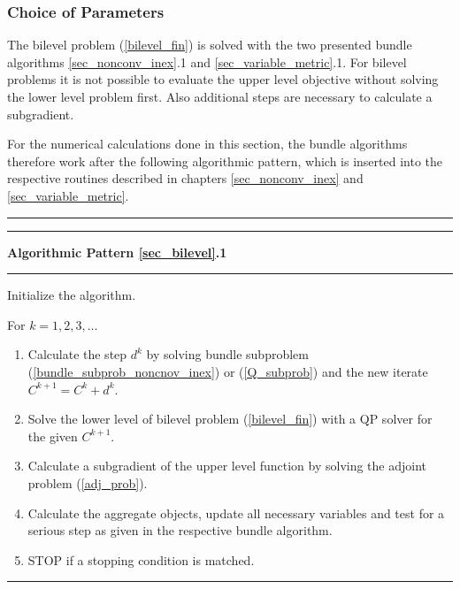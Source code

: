 \subsubsection{Choice of Parameters}

The bilevel problem (\ref{bilevel_fin}) is solved with the two presented bundle algorithms \ref{sec_nonconv_inex}.1 and \ref{sec_variable_metric}.1.
For bilevel problems it is not possible to evaluate the upper level objective without solving the lower level problem first. Also additional steps are necessary to calculate a subgradient.

For the numerical calculations done in this section, the bundle algorithms therefore work after the following algorithmic pattern, which is inserted into the respective routines described in chapters \ref{sec_nonconv_inex} and \ref{sec_variable_metric}.

\begin{minipage}\linewidth
\vspace{1em}
\hrule  \vspace{0.4ex} \hrule
\vspace{1ex}
\textbf{Algorithmic Pattern \ref{sec_bilevel}.1}
\vspace{1ex}
\hrule
\vspace{1ex}
Initialize the algorithm.
\end{minipage}

For \(k = 1,2,3,  \dotsc \)   

\begin{enumerate}
	\item Calculate the step \(d^k\) by solving bundle subproblem (\ref{bundle_subprob_noncnov_inex}) or (\ref{Q_subprob}) and the new iterate \(C^{k+1} = C^k+d^k\).
		\item Solve the lower level of bilevel problem (\ref{bilevel_fin}) with a QP solver for the given \(C^{k+1}\). 
	\item Calculate a subgradient of the upper level function by solving the adjoint problem (\ref{adj_prob}).
	\item Calculate the aggregate objects, update all necessary variables and test for a serious step as given in the respective bundle algorithm.
	\item STOP if a stopping condition is matched.
\end{enumerate}
\vspace{1ex}
\hrule

\vspace{1.5em}

